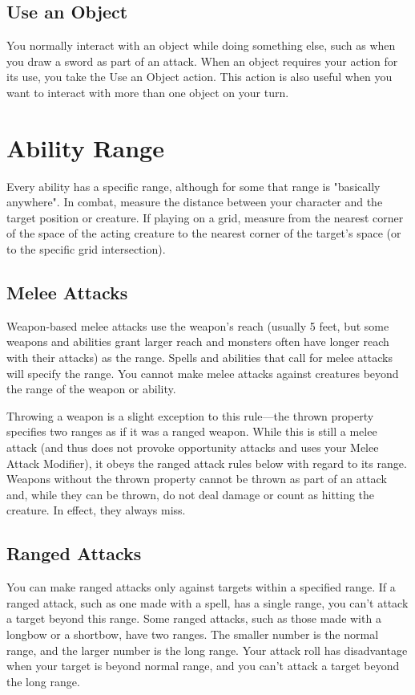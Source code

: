 \subsection{Use an Object}

You normally interact with an object while doing something else, such as when you draw a sword as part of an attack. When an object requires your action for its use, you take the Use an Object action. This action is also useful when you want to interact with more than one object on your turn.

\section{Ability Range}
Every ability has a specific range, although for some that range is "basically anywhere". In combat, measure the distance between your character and the target position or creature. If playing on a grid, measure from the nearest corner of the space of the acting creature to the nearest corner of the target's space (or to the specific grid intersection).

\subsection{Melee Attacks}
Weapon-based melee attacks use the weapon's reach (usually 5 feet, but some weapons and abilities grant larger reach and monsters often have longer reach with their attacks) as the range. Spells and abilities that call for melee attacks will specify the range. You cannot make melee attacks against creatures beyond the range of the weapon or ability.

Throwing a weapon is a slight exception to this rule---the thrown property specifies two ranges as if it was a ranged weapon. While this is still a melee attack (and thus does not provoke opportunity attacks and uses your Melee Attack Modifier), it obeys the ranged attack rules below with regard to its range. Weapons without the thrown property cannot be thrown as part of an attack and, while they can be thrown, do not deal damage or count as hitting the creature. In effect, they always miss. 

\subsection{Ranged Attacks}

You can make ranged attacks only against targets within a specified range. If a ranged attack, such as one made with a spell, has a single range, you can't attack a target beyond this range. Some ranged attacks, such as those made with a longbow or a shortbow, have two ranges. The smaller number is the normal range, and the larger number is the long range. Your attack roll has disadvantage when your target is beyond normal range, and you can't attack a target beyond the long range.

